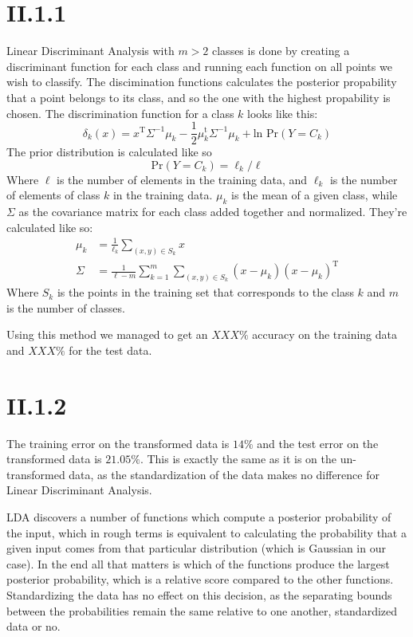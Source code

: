 \section*{II.1.1}
Linear Discriminant Analysis with $m>2$ classes is done by creating a
discriminant function for each class and running each function on all points we
wish to classify. The discimination functions calculates the posterior
propability that a point belongs to its class, and so the one with the highest
propability is chosen.
The discrimination function for a class $k$ looks like this:
\[
  \delta_k(x) = x^\text{T}\Sigma^{-1}\mu_k - \frac{1}{2}\mu^{\text{t}}_k\Sigma^{-1}\mu_k + \text{ln Pr}(Y = C_k)
\]
The prior distribution is calculated like so
\[
  \text{Pr}(Y = C_k) = \ell_k / \ell
\]
Where $\ell$ is the number of elements in the training data, and $\ell_k$ is the
number of elements of class $k$ in the training data. $\mu_k$ is the mean of a
given class, while $\Sigma$ as the covariance matrix for each class added
together and normalized. They're calculated like so:
\begin{align*}
  \mu_k  &= \frac{1}{\ell_k}\sum_{(x,y) \in S_k}x \\
  \Sigma &= \frac{1}{\ell - m}\sum_{k=1}^{m}\sum_{(x,y) \in S_k}(x-\mu_k)(x-\mu_k)^{\text{T}}
\end{align*}
Where $S_k$ is the points in the training set that corresponds to the class $k$
and $m$ is the number of classes.

Using this method we managed to get an $XXX\%$ accuracy on the training data and
$XXX\%$ for the test data.

\section{II.1.2}
The training error on the transformed data is $14\%$ and the test error on
the transformed data is $21.05\%$. This is exactly the same as it is on the
un-transformed data, as the standardization of the data makes no difference
for Linear Discriminant Analysis. 

LDA discovers a number of functions which compute a posterior probability of the input, 
which in rough terms is equivalent to calculating the probability that a given input comes 
from that particular distribution (which is Gaussian in our case). In the end all that matters is
which of the functions produce the largest posterior probability, which is a
relative score compared to the other functions. Standardizing the data has no effect on this decision,
as the separating bounds between the probabilities remain the same relative to one another, standardized 
data or no.
